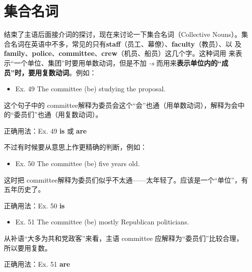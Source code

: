 \section{集合名词}

结束了主语后面接介词的探讨，现在来讨论一下集合名词（Collective Nouns）。集
合名词在英语中不多，常见的只有\textbf{staff}（员工、幕僚）、\textbf{faculty}（教员）、以
及\textbf{family}、\textbf{police}、\textbf{committee}、\textbf{crew}（机员、船员）这几个字。这种词用
来表示“一个单位、集团”时要用单数动词，但是不加 \emph{-s} 而用来\textbf{表示单位内的“成
  员”时，要用复数动词}。例如：

\begin{mybox}
\begin{itemize}
\item   Ex. 49 The committee (be) studying the proposal.
\end{itemize}

这个句子中的 committee解释为委员会这个“会”也通（用单数动词），解释为会中
的“委员们”也通（用复数动词）。

\tcblower

正确用法：Ex. 49 \textbf{is} 或 \textbf{are}
\end{mybox}

不过有时候要从意思上作更精确的判断，例如：
\begin{mybox}

\begin{itemize}
\item   Ex. 50 The committee (be) five years old.
\end{itemize}

这时把 committee解释为委员们似乎不太通——太年轻了。应该是一个“单位”，有
五年历史了。

\tcblower

正确用法：Ex. 50 \textbf{is}
\end{mybox}


\begin{mybox}

\begin{itemize}
\item   Ex. 51 The committee (be) mostly Republican politicians.
\end{itemize}

从补语“大多为共和党政客”来看，主语 committee
应解释为“委员们”比较合理，所以要用复数。

\tcblower

正确用法：Ex. 51 \textbf{are}
\end{mybox}

